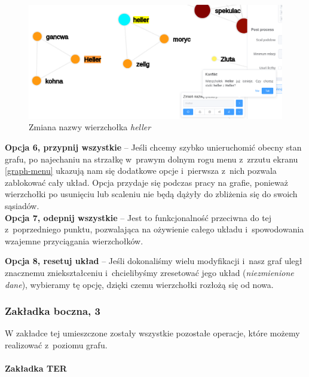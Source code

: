 \documentclass[12pt, a4paper]{article}
\newcommand{\subsubsubsection}[1]{\paragraph{#1}\mbox{}\\}
\begin{document}
\begin{figure}[H]
  \centering
  \includegraphics[width=\linewidth]{images/graph-change-name-heller.png}
  \caption{Zmiana nazwy wierzchołka \textit{heller}}
\end{figure}


\noindent \textbf{Opcja 6, przypnij wszystkie} -- Jeśli chcemy szybko unieruchomić obecny stan grafu, po najechaniu na strzałkę w~prawym dolnym rogu menu z~zrzutu ekranu \ref{graph-menu} ukazują nam się dodatkowe opcje i~pierwsza z~nich pozwala zablokować cały układ. Opcja przydaje się podczas pracy na grafie, ponieważ wierzchołki po usunięciu lub scaleniu nie będą dążyły do zbliżenia się do swoich sąsiadów.\\

\noindent \textbf{Opcja 7, odepnij wszystkie} -- Jest to funkcjonalność przeciwna do tej z~poprzedniego punktu, pozwalająca na ożywienie całego układu i~spowodowania wzajemne przyciągania wierzchołków.

\noindent \textbf{Opcja 8, resetuj układ} -- Jeśli dokonaliśmy wielu modyfikacji i~nasz graf uległ znacznemu zniekształceniu i~chcielibyśmy zresetować jego układ (\textit{niezmienione dane}), wybieramy tę opcję, dzięki czemu wierzchołki rozłożą się od nowa.

\subsubsection{Zakładka boczna, 3}

W zakładce tej umieszczone zostały wszystkie pozostałe operacje, które możemy realizować z~poziomu grafu.

\subsubsubsection{Zakładka TER}
\end{document}
